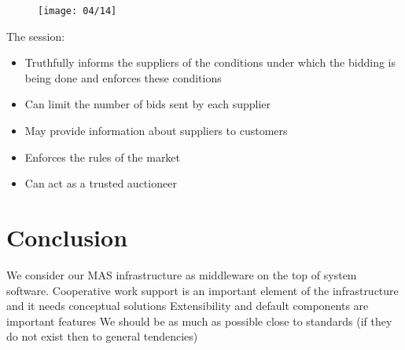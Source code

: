 \begin{figure}[!h]
\centering
\texttt{[image: 04/14]}
\end{figure}

The session:
\begin{itemize}
\item Truthfully informs the suppliers of the conditions under which the bidding is being done and enforces these conditions
\item Can limit the number of bids sent by each supplier
\item May provide information about suppliers to customers
\item Enforces the rules of the market
\item Can act as a trusted auctioneer
\end{itemize}

\section{Conclusion}
We consider our MAS infrastructure as middleware on the top of system software.
Cooperative work support is an important element of the infrastructure and it needs conceptual solutions
Extensibility and default components are important features
We should be as much as possible close to standards (if they do not exist then to general tendencies)



